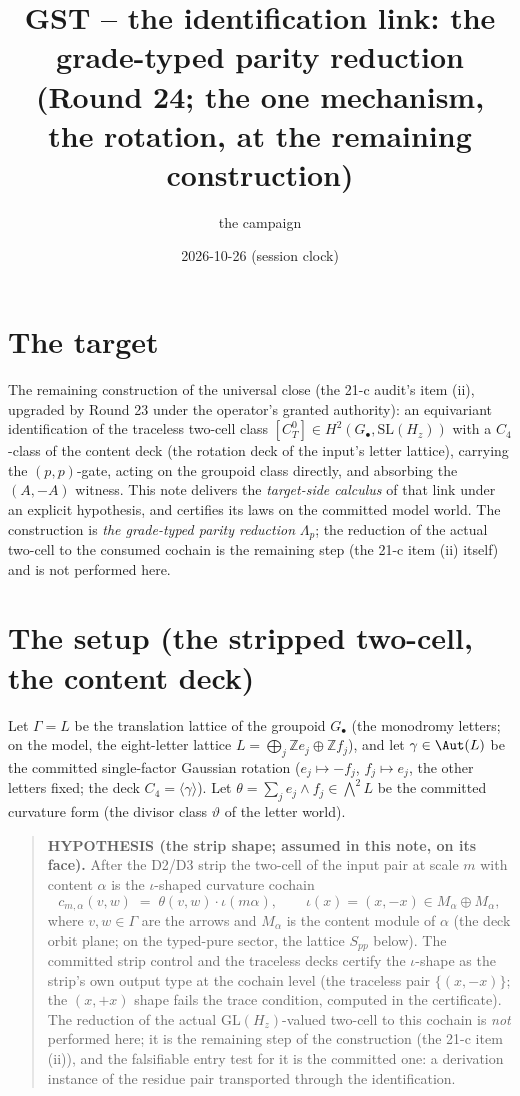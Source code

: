 \documentclass[11pt]{article}
\title{GST -- the identification link: the grade-typed parity reduction
(Round 24; the one mechanism, the rotation, at the remaining construction)}
\author{the campaign}
\date{2026-10-26 (session clock)}
\newcommand{\Z}{\mathbb{Z}}
\begin{document}
\maketitle

\section*{The target}

The remaining construction of the universal close (the 21-c audit's item (ii),
upgraded by Round 23 under the operator's granted authority): an equivariant
identification of the traceless two-cell class $[C_T^0]\in H^2(G_\bullet,
\mathrm{SL}(H_z))$ with a $C_4$-class of the content deck (the rotation deck of
the input's letter lattice), carrying the $(p,p)$-gate, acting on the groupoid
class directly, and absorbing the $(A,-A)$ witness. This note delivers the
\emph{target-side calculus} of that link under an explicit hypothesis, and
certifies its laws on the committed model world. The construction is
\emph{the grade-typed parity reduction} $\Lambda_p$; the reduction of the
actual two-cell to the consumed cochain is the remaining step (the 21-c item
(ii) itself) and is not performed here.

\section{The setup (the stripped two-cell, the content deck)}

Let $\Gamma = L$ be the translation lattice of the groupoid $G_\bullet$ (the
monodromy letters; on the model, the eight-letter lattice
$L=\bigoplus_j \Z e_j\oplus\Z f_j$), and let
$\gamma\in\Aut(L)$ be the committed single-factor Gaussian rotation
($e_j\mapsto -f_j$, $f_j\mapsto e_j$, the other letters fixed; the deck
$C_4=\langle\gamma\rangle$). Let
$\theta=\sum_j e_j\wedge f_j\in\bigwedge^2 L$ be the committed curvature form
(the divisor class $\vartheta$ of the letter world).

\begin{quote}
\textbf{HYPOTHESIS (the strip shape; assumed in this note, on its face).}
After the D2/D3 strip the two-cell of the input pair at scale $m$ with
content $\alpha$ is the $\iota$-shaped curvature cochain
\[
  c_{m,\alpha}(v,w)\;=\;\theta(v,w)\cdot\iota(m\alpha),\qquad
  \iota(x)=(x,-x)\in M_\alpha\oplus M_\alpha,
\]
where $v,w\in\Gamma$ are the arrows and $M_\alpha$ is the content module of
$\alpha$ (the deck orbit plane; on the typed-pure sector, the lattice
$S_{pp}$ below). The committed strip control and the traceless decks
certify the $\iota$-shape as the strip's own output type at the cochain
level (the traceless pair $\{(x,-x)\}$; the $(x,+x)$ shape fails the
trace condition, computed in the certificate). The reduction of the
actual $\mathrm{GL}(H_z)$-valued two-cell to this cochain is \emph{not}
performed here; it is the remaining step of the construction (the 21-c
item (ii)), and the falsifiable entry test for it is the committed one: a
derivation instance of the residue pair transported through the
identification.
\end{quote}
\end{document}
